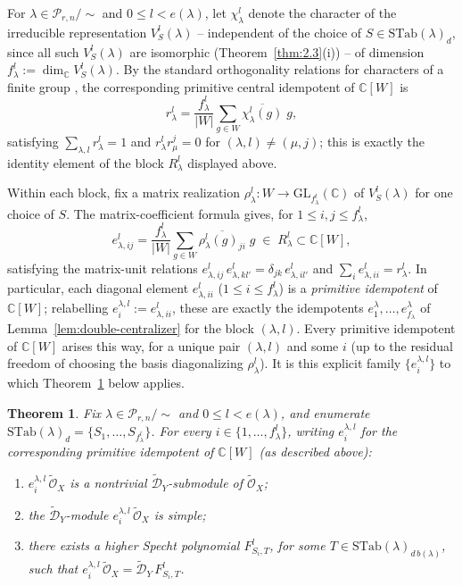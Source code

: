 \documentclass[11pt,a4paper]{article}
\newtheorem{theorem}{Theorem}[section]
\begin{document}
For $\lambda \in \mathcal{P}_{r,n}/\sim$ and $0 \le l < e(\lambda)$,
let $\chi^l_\lambda$ denote the character of the irreducible
representation $V^l_S(\lambda)$ -- independent of the choice of
$S \in \mathrm{STab}(\lambda)_d$, since all such $V^l_S(\lambda)$ are
isomorphic (Theorem~\ref{thm:2.3}(i)) -- of dimension
$f^l_\lambda := \dim_{\mathbb{C}} V^l_S(\lambda)$. By the standard
orthogonality relations for characters of a finite group
\cite[\S 2.3]{FultonHarris1991}, the corresponding primitive central
idempotent of $\mathbb{C}[W]$ is
\[
  r^l_\lambda = \frac{f^l_\lambda}{|W|} \sum_{g \in W} \overline{\chi^l_\lambda(g)}\; g,
\]
satisfying $\sum_{\lambda,l} r^l_\lambda = 1$ and
$r^l_\lambda r^j_\mu = 0$ for $(\lambda,l) \ne (\mu,j)$; this is
exactly the identity element of the block $R^l_\lambda$ displayed
above.

Within each block, fix a matrix realization
$\rho^l_\lambda : W \to \mathrm{GL}_{f^l_\lambda}(\mathbb{C})$ of
$V^l_S(\lambda)$ for one choice of $S$. The matrix-coefficient
formula \cite[\S 2.4]{FultonHarris1991} gives, for
$1 \le i,j \le f^l_\lambda$,
\[
  e^l_{\lambda,ij} = \frac{f^l_\lambda}{|W|} \sum_{g \in W}
    \overline{\rho^l_\lambda(g)_{ji}}\; g \;\in\; R^l_\lambda \subset \mathbb{C}[W],
\]
satisfying the matrix-unit relations
$e^l_{\lambda,ij}\, e^l_{\lambda,kl'} = \delta_{jk}\, e^l_{\lambda,il'}$
and $\sum_i e^l_{\lambda,ii} = r^l_\lambda$. In particular, each
diagonal element $e^l_{\lambda,ii}$ ($1 \le i \le f^l_\lambda$) is a
\emph{primitive idempotent} of $\mathbb{C}[W]$; relabelling
$e^{\lambda,l}_i := e^l_{\lambda,ii}$, these are exactly the
idempotents $e_1^\lambda,\dots,e_{f_\lambda}^\lambda$ of
Lemma~\ref{lem:double-centralizer} for the block $(\lambda,l)$. Every
primitive idempotent of $\mathbb{C}[W]$ arises this way, for a unique
pair $(\lambda,l)$ and some $i$ (up to the residual freedom of
choosing the basis diagonalizing $\rho^l_\lambda$). It is this
explicit family $\{e^{\lambda,l}_i\}$ to which
Theorem~\ref{thm:main-general} below applies.

\begin{theorem}\label{thm:main-general}
Fix $\lambda \in \mathcal{P}_{r,n}/\sim$ and $0 \le l < e(\lambda)$,
and enumerate $\mathrm{STab}(\lambda)_d = \{S_1,\dots,S_{f^l_\lambda}\}$.
For every $i \in \{1,\dots,f^l_\lambda\}$, writing $e^{\lambda,l}_i$
for the corresponding primitive idempotent of $\mathbb{C}[W]$
(as described above):
\begin{enumerate}[label=(\roman*)]
 \item $e^{\lambda,l}_i\,\widetilde{\mathcal{O}}_X$ is a nontrivial
 $\widetilde{\mathcal{D}}_Y$-submodule of $\widetilde{\mathcal{O}}_X$;
 \item the $\widetilde{\mathcal{D}}_Y$-module
 $e^{\lambda,l}_i\,\widetilde{\mathcal{O}}_X$ is simple;
 \item there exists a higher Specht polynomial $F^l_{S_i,T}$, for some
 $T \in \mathrm{STab}(\lambda)_{d\,b(\lambda)}$, such that
 $e^{\lambda,l}_i\,\widetilde{\mathcal{O}}_X = \widetilde{\mathcal{D}}_Y \, F^l_{S_i,T}$.
\end{enumerate}
\end{theorem}
\end{document}
